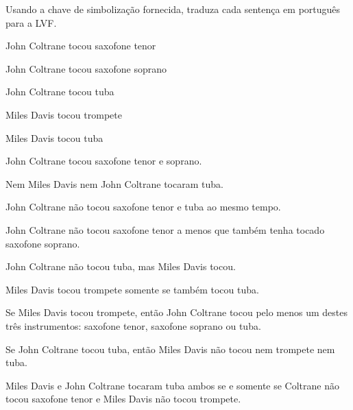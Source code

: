 \problempart
Usando a chave de simbolização fornecida, traduza cada sentença em português para a LVF.
\label{pr.jazzinstruments}
\begin{ekey}
\item[J_1] John Coltrane tocou saxofone tenor
\item[J_2] John Coltrane tocou saxofone soprano
\item[J_3] John Coltrane tocou tuba
\item[M_1] Miles Davis tocou trompete
\item[M_2] Miles Davis tocou tuba
\end{ekey}

\begin{compactlist}
\item John Coltrane tocou saxofone tenor e soprano.
\item[~]  
\item Nem Miles Davis nem John Coltrane tocaram tuba.
\item[~] 
\item John Coltrane não tocou saxofone tenor e tuba ao mesmo tempo.
\item[~]  
\item John Coltrane não tocou saxofone tenor a menos que também tenha tocado saxofone soprano.
\item[~] 
\item John Coltrane não tocou tuba, mas Miles Davis tocou.
\item[~] 
\item Miles Davis tocou trompete somente se também tocou tuba.
\item[~]  
\item Se Miles Davis tocou trompete, então John Coltrane tocou pelo menos um destes três instrumentos: saxofone tenor, saxofone soprano ou tuba.
\item[~]  
\item Se John Coltrane tocou tuba, então Miles Davis não tocou nem trompete nem tuba.
\item[~]  
\item Miles Davis e John Coltrane tocaram tuba ambos se e somente se Coltrane não tocou saxofone tenor e Miles Davis não tocou trompete.
\item[~]  
\end{compactlist}

